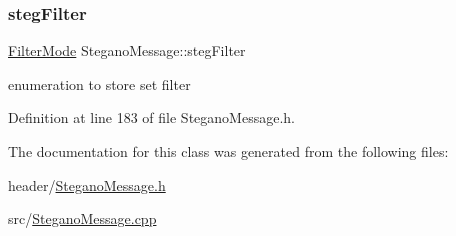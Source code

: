 \mbox{\label{classSteganoMessage_af20fb772ae34deaccd23144b38f06320}} 
\subsubsection{\texorpdfstring{stegFilter}{stegFilter}}
{\footnotesize\ttfamily \mbox{\hyperlink{constants_8h_a36bd51b89b9e0e6e4dbbe565b9155083}{Filter\+Mode}} Stegano\+Message\+::steg\+Filter\hspace{0.3cm}{\ttfamily [private]}}

enumeration to store set filter 

Definition at line 183 of file Stegano\+Message.\+h.



The documentation for this class was generated from the following files\+:\begin{DoxyCompactItemize}
\item 
header/\mbox{\hyperlink{SteganoMessage_8h}{Stegano\+Message.\+h}}\item 
src/\mbox{\hyperlink{SteganoMessage_8cpp}{Stegano\+Message.\+cpp}}\end{DoxyCompactItemize}
